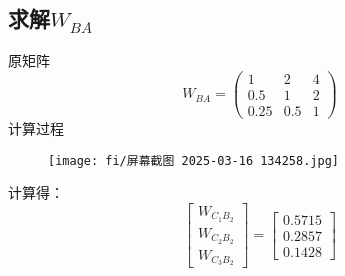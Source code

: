 \documentclass{article}
\begin{document}
\subsection{求解$W_{BA}$}
原矩阵
    \[
     W_{BA} = \begin{pmatrix}
     1 & 2 & 4 \\
     0.5& 1  & 2 \\
     0.25 & 0.5  & 1
     \end{pmatrix}
    \]
    计算过程
    \begin{figure}[h]
        \centering
        \texttt{[image: fi/屏幕截图 2025-03-16 134258.jpg]}
    \end{figure}
        计算得：
        \begin{equation}
            \left[
            \begin{array}{c}
            W_{C_1B_2} \\
            W_{C_2B_2} \\
            W_{C_3B_2}
            \end{array}
            \right]
            =
            \left[
            \begin{array}{c}
            0.5715\\ 
            0.2857 \\
            0.1428
            \end{array}
            \right]
            \end{equation}
\end{document}
